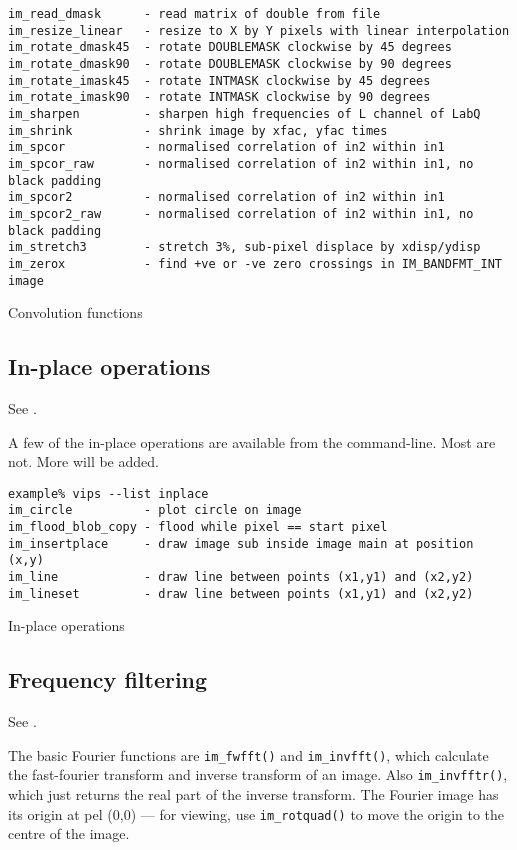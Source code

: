 \begin{fig2}
\begin{verbatim}
im_read_dmask      - read matrix of double from file
im_resize_linear   - resize to X by Y pixels with linear interpolation
im_rotate_dmask45  - rotate DOUBLEMASK clockwise by 45 degrees
im_rotate_dmask90  - rotate DOUBLEMASK clockwise by 90 degrees
im_rotate_imask45  - rotate INTMASK clockwise by 45 degrees
im_rotate_imask90  - rotate INTMASK clockwise by 90 degrees
im_sharpen         - sharpen high frequencies of L channel of LabQ
im_shrink          - shrink image by xfac, yfac times
im_spcor           - normalised correlation of in2 within in1
im_spcor_raw       - normalised correlation of in2 within in1, no black padding
im_spcor2          - normalised correlation of in2 within in1
im_spcor2_raw      - normalised correlation of in2 within in1, no black padding
im_stretch3        - stretch 3%, sub-pixel displace by xdisp/ydisp
im_zerox           - find +ve or -ve zero crossings in IM_BANDFMT_INT image
\end{verbatim}
\caption{Convolution functions}
\label{fg:convolution}
\end{fig2}

\subsection{In-place operations}
\label{sec:inplace}

See .

A few of the in-place operations are available from the command-line. Most are
not. More will be added.

\begin{fig2}
\begin{verbatim}
example% vips --list inplace
im_circle          - plot circle on image
im_flood_blob_copy - flood while pixel == start pixel
im_insertplace     - draw image sub inside image main at position (x,y)
im_line            - draw line between points (x1,y1) and (x2,y2)
im_lineset         - draw line between points (x1,y1) and (x2,y2)
\end{verbatim}
\caption{In-place operations}
\label{fg:inplace}
\end{fig2}

\subsection{Frequency filtering}

See .

The basic Fourier functions are \verb+im_fwfft()+ and
\verb+im_invfft()+, which calculate the fast-fourier transform and inverse
transform of an image. Also \verb+im_invfftr()+, which just returns the real
part of the inverse transform.
The Fourier image has its origin at pel (0,0) ---
for viewing, use \verb+im_rotquad()+ to move the origin to the centre of
the image.

